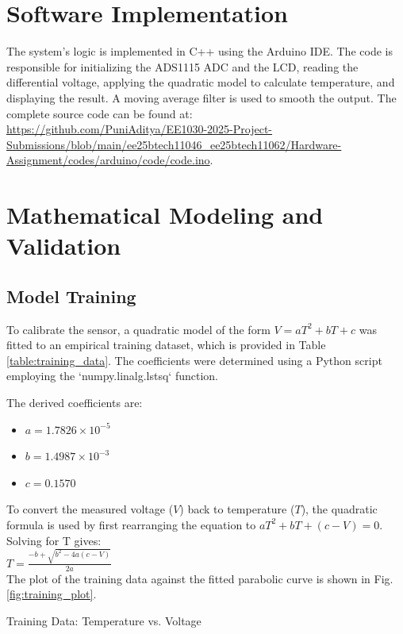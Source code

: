\documentclass[conference]{IEEEtran}
\begin{document}
\section{Software Implementation}
The system's logic is implemented in C++ using the Arduino IDE. The code is responsible for initializing the ADS1115 ADC and the LCD, reading the differential voltage, applying the quadratic model to calculate temperature, and displaying the result. A moving average filter is used to smooth the output. The complete source code can be found at: \\
{\url{https://github.com/PuniAditya/EE1030-2025-Project-Submissions/blob/main/ee25btech11046_ee25btech11062/Hardware-Assignment/codes/arduino/code/code.ino}}.

\section{Mathematical Modeling and Validation}
\subsection{Model Training}
To calibrate the sensor, a quadratic model of the form $V = aT^2 + bT + c$ was fitted to an empirical training dataset, which is provided in Table \ref{table:training_data}. The coefficients were determined using a Python script employing the `numpy.linalg.lstsq` function.

The derived coefficients are:
\begin{itemize}
    \item $a = 1.7826 \times 10^{-5}$
    \item $b = 1.4987 \times 10^{-3}$
    \item $c = 0.1570$
\end{itemize}

To convert the measured voltage ($V$) back to temperature ($T$), the quadratic formula is used by first rearranging the equation to $aT^2 + bT + (c - V) = 0$. Solving for T gives:
\\[10pt]
$T = \frac{-b + \sqrt{b^2 - 4a(c - V)}}{2a}$
\\[10pt]

The plot of the training data against the fitted parabolic curve is shown in Fig. \ref{fig:training_plot}.

\begin{table}[!h]
  \centering
  \caption{Training Data: Temperature vs. Voltage}
  \label{table:training_data}
  
\end{table}
\end{document}
